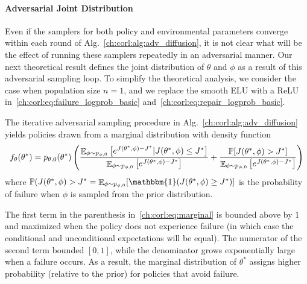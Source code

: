 \paragraph{Adversarial Joint Distribution} Even if the samplers for both policy and environmental parameters converge within each round of Alg.~\ref{ch:corl:alg:adv_diffusion}, it is not clear what will be the effect of running these samplers repeatedly in an adversarial manner. Our next theoretical result defines the joint distribution of $\theta$ and $\phi$ as a result of this adversarial sampling loop. To simplify the theoretical analysis, we consider the case when population size $n=1$, and we replace the smooth ELU with a ReLU in~\eqref{ch:corl:eq:failure_logprob_basic} and~\eqref{ch:corl:eq:repair_logprob_basic}.

\begin{theorem}\label{ch:corl:thm:joint}
    The iterative adversarial sampling procedure in Alg.~\ref{ch:corl:alg:adv_diffusion} yields policies drawn from a marginal distribution with density function
    \begin{equation}
        f_\theta(\theta^*) = p_{\theta, 0}(\theta^*) \left( \frac{\mathop{\mathbb{E}}_{\phi \sim p_{\phi, 0}}\left[ e^{J(\theta^*, \phi) - J^*} | J(\theta^*, \phi) \leq J^* \right]}{\mathop{\mathbb{E}}_{\phi \sim p_{\phi, 0}}\left[ e^{J(\theta^*, \phi) - J^*} \right]} +
            \frac{\mathbb{P}[J(\theta^*, \phi) > J^*]}{\mathop{\mathbb{E}}_{\phi \sim p_{\phi, 0}}\left[ e^{J(\theta^*, \phi) - J^*}\right]} \right)\label{ch:corl:eq:marginal}
    \end{equation}
    where $\mathbb{P}(J(\theta^*, \phi) > J^* = \expectation_{\phi \sim p_{\phi, 0}}[\mathbbm{1}(J(\theta^*, \phi) \geq J^*)]$ is the probability of failure when $\phi$ is sampled from the prior distribution.
\end{theorem}

The first term in the parenthesis in~\eqref{ch:corl:eq:marginal} is bounded above by $1$ and maximized when the policy does not experience failure (in which case the conditional and unconditional expectations will be equal). The numerator of the second term bounded $[0, 1]$, while the denominator grows exponentially large when a failure occurs. As a result, the marginal distribution of $\theta^*$ assigns higher probability (relative to the prior) for policies that avoid failure.

